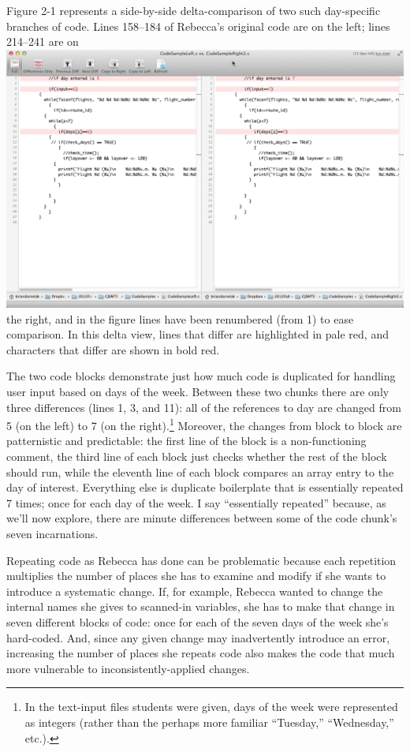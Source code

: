 Figure 2-1 represents a side-by-side delta-comparison of two such day-specific branches of code. Lines 158--184 of Rebecca's original code are on the left; lines 214--241 are on \includegraphics{media/media/image3.png}the right, and in the figure lines have been renumbered (from 1) to ease comparison. In this delta view, lines that differ are highlighted in pale red, and characters that differ are shown in bold red.

The two code blocks demonstrate just how much code is duplicated for handling user input based on days of the week. Between these two chunks there are only three differences (lines 1, 3, and 11): all of the references to day are changed from 5 (on the left) to 7 (on the right).\footnote{In the text-input files students were given, days of the week were represented as integers (rather than the perhaps more familiar ``Tuesday,'' ``Wednesday,'' etc.).} Moreover, the changes from block to block are patternistic and predictable: the first line of the block is a non-functioning comment, the third line of each block just checks whether the rest of the block should run, while the eleventh line of each block compares an array entry to the day of interest. Everything else is duplicate boilerplate that is essentially repeated 7 times; once for each day of the week. I say ``essentially repeated'' because, as we'll now explore, there are minute differences between some of the code chunk's seven incarnations.

Repeating code as Rebecca has done can be problematic because each repetition multiplies the number of places she has to examine and modify if she wants to introduce a systematic change. If, for example, Rebecca wanted to change the internal names she gives to scanned-in variables, she has to make that change in seven different blocks of code: once for each of the seven days of the week she's hard-coded. And, since any given change may inadvertently introduce an error, increasing the number of places she repeats code also makes the code that much more vulnerable to inconsistently-applied changes.

